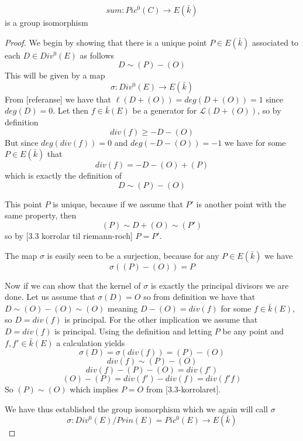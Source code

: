 \begin{thm}
 $$ sum: Pic^0(C) \rightarrow E(\bar{k}) $$
is a group isomorphism
\end{thm}
\begin{proof}
 We begin by showing that there is a unique point $P \in E(\bar{k})$ associated to
each $D \in Div^0(E)$ as follows
$$ D \sim (P) -(O) $$
This will be given by a map
$$ \sigma: Div^0(E) \rightarrow E(\bar{k}) $$
From [referanse] we have that $\ell(D+(O)) = deg(D+(O)) = 1$ since $deg(D) = 0$.
Let then $f \in \bar{k}(E)$ be a generator for $\mathscr{L}(D+(O))$, so by definition
$$ div(f) \geq -D-(O) $$
But since $deg(div(f)) = 0$ and $deg(-D-(O)) = -1$ we have for some $P \in E(\bar{k})$ that
$$ div(f) = -D-(O)+(P) $$
which is exactly the definition of
$$ D \sim (P) - (O) $$

This point $P$ is unique, because if we assume that $P'$ is another point with the same
property, then
$$ (P) \sim D + (O) \sim (P') $$
so by [3.3 korrolar til riemann-roch]
$ P = P'$.

The map $\sigma$ is easily seen to be a surjection, because for any $P \in E(\bar{k})$ we have
$$ \sigma((P)-(O)) = P $$

Now if we can show that the kernel of $\sigma$ is exactly the principal divisors we are done.
Let us assume that $\sigma(D) = O$ so from definition we have that $D \sim (O)-(O) \sim (O)$
meaning $D - (O) = div(f)$ for some $f \in \bar{k}(E)$, so $D = div(f)$ is principal.
For the other implication we assume that $D = div(f)$ is principal. Using the definition and
letting $P$ be any point and $f, f' \in \bar{k}(E)$ a calculation yields
$$ \sigma(D) = \sigma(div(f)) = (P)-(O) $$
$$ div(f) \sim (P) - (O) $$
$$ div(f) - (P) - (O) = div(f') $$
$$ (O) - (P) = div(f') - div(f) = div(f' f) $$
So $ (P) \sim (O) $ which implies $P = O$ from [3.3-korrolaret].

We have thus established the group isomorphism which we again will call $\sigma$
$$ \sigma : Div^0(E)/Prin(E) = Pic^0(E) \rightarrow E(\bar{k}) $$

\end{proof}
